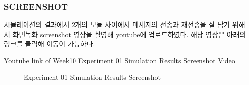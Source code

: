         \subsubsection{SCREENSHOT}
        시뮬레이션의 결과에서 2개의 모듈 사이에서 메세지의 전송과 재전송을 잘 담기 위해서 화면녹화 screenshot 영상을 촬영해 youtube에 업로드하였다. 해당 영상은 아래의 링크를 클릭해 이동이 가능하다.
        \vspace{-10mm}
            \begin{center}
                \item \href{https://youtu.be/DeSb_LjcU70}
            	{Youtube link of Week10 Experiment 01 Simulation Results Screenshot Video}
            \end{center}
        \vspace{-6mm}
            \begin{figure}[h!]
            \centering
            \hspace{3mm}
            \caption{Experiment 01 Simulation Results Screenshot}
            \end{figure}
            \vspace{-6mm}
